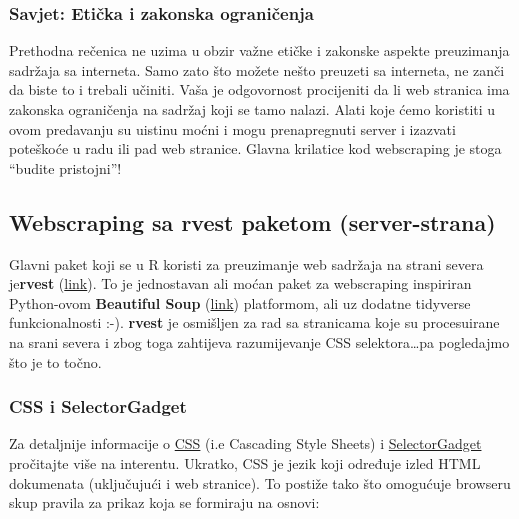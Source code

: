 \documentclass[
]{article}
\begin{document}
\hypertarget{savjet-etiux10dka-i-zakonska-ograniux10denja}{%
\subsubsection{Savjet: Etička i zakonska
ograničenja}\label{savjet-etiux10dka-i-zakonska-ograniux10denja}}

Prethodna rečenica ne uzima u obzir važne etičke i zakonske aspekte
preuzimanja sadržaja sa interneta. Samo zato što možete nešto preuzeti
sa interneta, ne zanči da biste to i trebali učiniti. Vaša je
odgovornost procijeniti da li web stranica ima zakonska ograničenja na
sadržaj koji se tamo nalazi. Alati koje ćemo koristiti u ovom predavanju
su uistinu moćni i mogu prenapregnuti server i izazvati poteškoće u radu
ili pad web stranice. Glavna krilatice kod webscraping je stoga ``budite
pristojni''!

\hypertarget{webscraping-sa-rvest-paketom-server-strana}{%
\subsection{\texorpdfstring{Webscraping sa \textbf{rvest} paketom
(server-strana)}{Webscraping sa rvest paketom (server-strana)}}\label{webscraping-sa-rvest-paketom-server-strana}}

Glavni paket koji se u R koristi za preuzimanje web sadržaja na strani
severa je\textbf{rvest} (\href{https://rvest.tidyverse.org/}{link}). To
je jednostavan ali moćan paket za webscraping inspiriran Python-ovom
\textbf{Beautiful Soup}
(\href{https://www.crummy.com/software/BeautifulSoup/}{link})
platformom, ali uz dodatne tidyverse funkcionalnosti :-). \textbf{rvest}
je osmišljen za rad sa stranicama koje su procesuirane na srani severa i
zbog toga zahtijeva razumijevanje CSS selektora\ldots pa pogledajmo što
je to točno.

\hypertarget{css-i-selectorgadget}{%
\subsubsection{CSS i SelectorGadget}\label{css-i-selectorgadget}}

Za detaljnije informacije o
\href{https://developer.mozilla.org/en-US/docs/Learn/CSS/Introduction_to_CSS/How_CSS_works}{CSS}
(i.e Cascading Style Sheets) i
\href{http://selectorgadget.com/}{SelectorGadget} pročitajte više na
interentu. Ukratko, CSS je jezik koji određuje izled HTML dokumenata
(uključujući i web stranice). To postiže tako što omogućuje browseru
skup pravila za prikaz koja se formiraju na osnovi:
\end{document}
